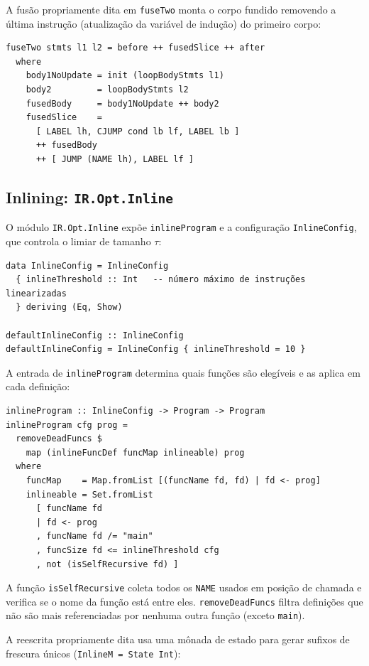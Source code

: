 A fusão propriamente dita em \texttt{fuseTwo} monta o corpo fundido removendo a
última instrução (atualização da variável de indução) do primeiro corpo:

\begin{verbatim}
fuseTwo stmts l1 l2 = before ++ fusedSlice ++ after
  where
    body1NoUpdate = init (loopBodyStmts l1)
    body2         = loopBodyStmts l2
    fusedBody     = body1NoUpdate ++ body2
    fusedSlice    =
      [ LABEL lh, CJUMP cond lb lf, LABEL lb ]
      ++ fusedBody
      ++ [ JUMP (NAME lh), LABEL lf ]
\end{verbatim}

\subsection{Inlining: \texttt{IR.Opt.Inline}}\label{sec:impl-inline}

O módulo \texttt{IR.Opt.Inline} expõe \texttt{inlineProgram} e a configuração
\texttt{InlineConfig}, que controla o limiar de tamanho $\tau$:

\begin{verbatim}
data InlineConfig = InlineConfig
  { inlineThreshold :: Int   -- número máximo de instruções linearizadas
  } deriving (Eq, Show)

defaultInlineConfig :: InlineConfig
defaultInlineConfig = InlineConfig { inlineThreshold = 10 }
\end{verbatim}

A entrada de \texttt{inlineProgram} determina quais funções são elegíveis e as
aplica em cada definição:

\begin{verbatim}
inlineProgram :: InlineConfig -> Program -> Program
inlineProgram cfg prog =
  removeDeadFuncs $
    map (inlineFuncDef funcMap inlineable) prog
  where
    funcMap    = Map.fromList [(funcName fd, fd) | fd <- prog]
    inlineable = Set.fromList
      [ funcName fd
      | fd <- prog
      , funcName fd /= "main"
      , funcSize fd <= inlineThreshold cfg
      , not (isSelfRecursive fd) ]
\end{verbatim}

A função \texttt{isSelfRecursive} coleta todos os \texttt{NAME} usados em
posição de chamada e verifica se o nome da função está entre eles.
\texttt{removeDeadFuncs} filtra definições que não são mais referenciadas por
nenhuma outra função (exceto \texttt{main}).

A reescrita propriamente dita usa uma mônada de estado para gerar sufixos de
frescura únicos (\texttt{InlineM = State Int}):

